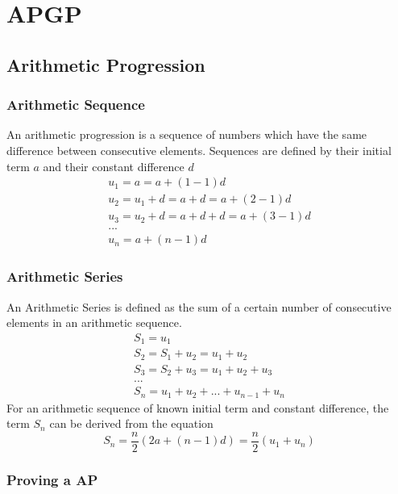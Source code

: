 \documentclass[../main]{subfiles}
\begin{document}
\section{APGP}

\subsection{Arithmetic Progression}

	\subsubsection{Arithmetic Sequence}
	An arithmetic progression is a sequence of numbers which have the same difference between consecutive elements. Sequences are defined by their initial term \(a\) and their constant difference \(d\)
	\begin{equation*} \begin{gathered}
		u_1 = a = a + (1-1) d\\
		u_2 = u_1 + d = a + d = a + (2-1) d \\
		u_3 = u_2 + d = a + d + d = a + (3-1) d\\
		...\\
		u_n = a + (n-1) d 
	\end{gathered} \end{equation*} 
	\subsubsection{Arithmetic Series}
	An Arithmetic Series is defined as the sum of a certain number of consecutive elements in an arithmetic sequence.
	\begin{equation*} \begin{gathered}
		S_1 = u_1 \\
		S_2 = S_1 + u_2 = u_1 + u_2 \\
		S_3 = S_2 + u_3 = u_1 + u_2 + u_3 \\
		... \\
		S_n = u_1 + u_2 + ... + u_{n-1} + u_n
	\end{gathered} \end{equation*} 
	For an arithmetic sequence of known initial term and constant difference, the term \(S_n\) can be derived from the equation
	\[ S_n = \frac{n}{2}(2a + (n-1)d) = \frac{n}{2}(u_1 + u_n) \]
	\subsubsection{Proving a AP}
\end{document}
